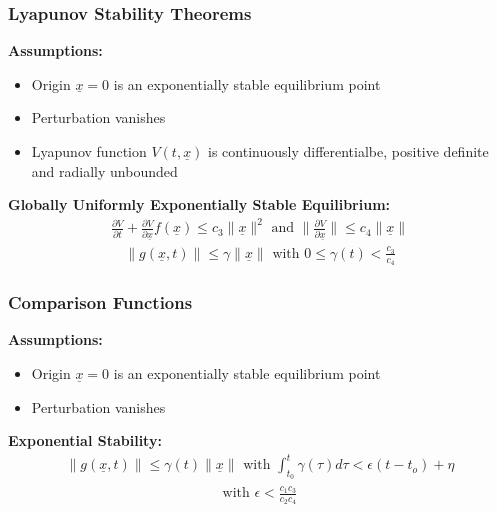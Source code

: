 \documentclass[student, noshadow, lsr, english, aspectratio=169, t]{ITR_LSR_slides}
\begin{document}
\begin{frame}
	\frametitle{Lyapunov Stability Theorems}
	\textbf{Assumptions:}
	\begin{itemize}
		\item Origin $\underline{x}=0$ is an exponentially stable equilibrium point
		\item Perturbation vanishes
		\item Lyapunov function $V(t,\underline{x})$ is continuously differentialbe, positive definite and radially unbounded
	\end{itemize}
	\vspace{0.5cm}
	\textbf{Globally Uniformly Exponentially Stable Equilibrium:}
	\begin{align*}
		\frac{\partial V}{\partial t}+\frac{\partial V}{\partial \underline{x}}f(\underline{x}) \leq c_3\|\underline{x}\|^2 \text{ and }\|\frac{\partial V}{\partial \underline{x}}\| \leq c_4\|\underline{x}\|
	\end{align*}
	\begin{align*}
		\|g(\underline{x},t)\| \leq \gamma\|\underline{x}\| \text{ with }0\leq\gamma(t)<\frac{c_3}{c_4}
	\end{align*}

\end{frame}

\begin{frame}
	\frametitle{Comparison Functions}
	\textbf{Assumptions:}
	\begin{itemize}
		\item Origin $\underline{x}=0$ is an exponentially stable equilibrium point
		\item Perturbation vanishes
	\end{itemize}
	\vspace{0.5cm}
	\textbf{Exponential Stability:}
	\begin{align*}
		\|g(\underline{x},t)\| \leq \gamma(t)\|\underline{x}\| \text{ with }\int_{t_0}^{t}\gamma(\tau)d\tau<\epsilon(t-t_o)+\eta
	\end{align*}
	\begin{align*}
		\text{with } \epsilon < \frac{c_1c_3}{c_2c_4}
	\end{align*}
\end{frame}
\end{document}
